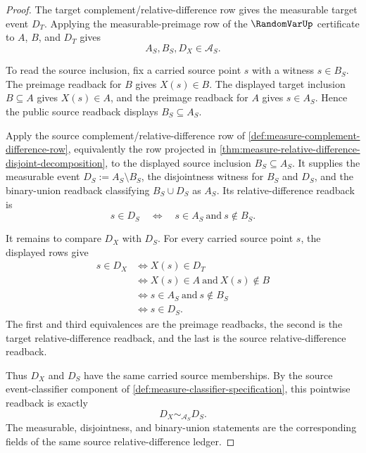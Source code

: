 \begin{proof}
The target complement/relative-difference row gives the measurable target event $D_T$. Applying the measurable-preimage row of the $\RandomVarUp$ certificate to $A$, $B$, and $D_T$ gives
$$
A_S,B_S,D_X\in\mathcal{A}_S.
$$

To read the source inclusion, fix a carried source point $s$ with a witness $s\in B_S$. The preimage readback for $B$ gives $X(s)\in B$. The displayed target inclusion $B\subseteq A$ gives $X(s)\in A$, and the preimage readback for $A$ gives $s\in A_S$. Hence the public source readback displays $B_S\subseteq A_S$.

Apply the source complement/relative-difference row of \autoref{def:measure-complement-difference-row}, equivalently the row projected in \autoref{thm:measure-relative-difference-disjoint-decomposition}, to the displayed source inclusion $B_S\subseteq A_S$. It supplies the measurable event $D_S:=A_S\setminus B_S$, the disjointness witness for $B_S$ and $D_S$, and the binary-union readback classifying $B_S\cup D_S$ as $A_S$. Its relative-difference readback is
$$
s\in D_S\quad\Longleftrightarrow\quad s\in A_S\ \text{and}\ s\notin B_S.
$$

It remains to compare $D_X$ with $D_S$. For every carried source point $s$, the displayed rows give
$$
\begin{aligned}
s\in D_X
&\Longleftrightarrow X(s)\in D_T\\
&\Longleftrightarrow X(s)\in A\ \text{and}\ X(s)\notin B\\
&\Longleftrightarrow s\in A_S\ \text{and}\ s\notin B_S\\
&\Longleftrightarrow s\in D_S.
\end{aligned}
$$
The first and third equivalences are the preimage readbacks, the second is the target relative-difference readback, and the last is the source relative-difference readback.

Thus $D_X$ and $D_S$ have the same carried source memberships. By the source event-classifier component of \autoref{def:measure-classifier-specification}, this pointwise readback is exactly
$$
D_X\sim_{\mathcal{A}_S}D_S.
$$
The measurable, disjointness, and binary-union statements are the corresponding fields of the same source relative-difference ledger.
\end{proof}

